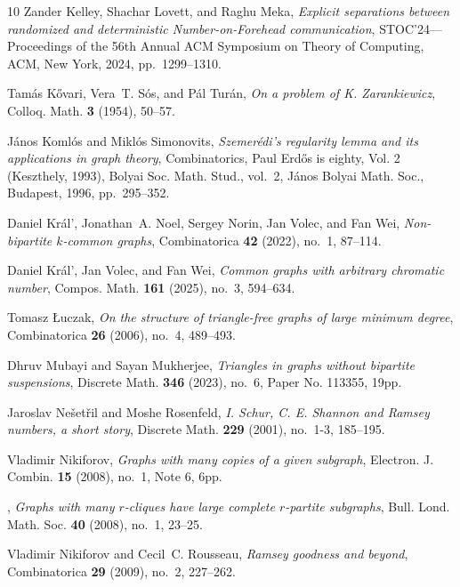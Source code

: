 \begin{thebibliography}{10}
Zander Kelley, Shachar Lovett, and Raghu Meka, \emph{Explicit separations
  between randomized and deterministic {N}umber-on-{F}orehead communication},
  S{TOC}'24---{P}roceedings of the 56th {A}nnual {ACM} {S}ymposium on {T}heory
  of {C}omputing, ACM, New York, 2024, pp.~1299--1310. 

Tam\'{a}s K\H{o}vari, Vera~T. S\'{o}s, and P\'{a}l Tur\'{a}n, \emph{On a
  problem of {K}. {Z}arankiewicz}, Colloq. Math. \textbf{3} (1954), 50--57.

J\'{a}nos Koml\'os and Mikl\'{o}s Simonovits, \emph{Szemer\'edi's regularity
  lemma and its applications in graph theory}, Combinatorics, {P}aul {E}rd\H os
  is eighty, {V}ol. 2 ({K}eszthely, 1993), Bolyai Soc. Math. Stud., vol.~2,
  J\'anos Bolyai Math. Soc., Budapest, 1996, pp.~295--352. 

Daniel Kr\'al', Jonathan~A. Noel, Sergey Norin, Jan Volec, and Fan Wei,
  \emph{Non-bipartite $k$-common graphs}, Combinatorica \textbf{42} (2022),
  no.~1, 87--114. 

Daniel Kr\'al', Jan Volec, and Fan Wei, \emph{Common graphs with arbitrary
  chromatic number}, Compos. Math. \textbf{161} (2025), no.~3, 594--634.

Tomasz \L{}uczak, \emph{On the structure of triangle-free graphs of large
  minimum degree}, Combinatorica \textbf{26} (2006), no.~4, 489--493.

Dhruv Mubayi and Sayan Mukherjee, \emph{Triangles in graphs without bipartite
  suspensions}, Discrete Math. \textbf{346} (2023), no.~6, Paper No. 113355,
  19pp. 

Jaroslav Ne\v{s}et\v{r}il and Moshe Rosenfeld, \emph{I. {S}chur, {C}. {E}.
  {S}hannon and {R}amsey numbers, a short story}, Discrete Math. \textbf{229}
  (2001), no.~1-3, 185--195. 

Vladimir Nikiforov, \emph{Graphs with many copies of a given subgraph},
  Electron. J. Combin. \textbf{15} (2008), no.~1, Note 6, 6pp. 

\bysame, \emph{Graphs with many {$r$}-cliques have large complete {$r$}-partite
  subgraphs}, Bull. Lond. Math. Soc. \textbf{40} (2008), no.~1, 23--25.

Vladimir Nikiforov and Cecil~C. Rousseau, \emph{Ramsey goodness and beyond},
  Combinatorica \textbf{29} (2009), no.~2, 227--262. 


\end{thebibliography}
